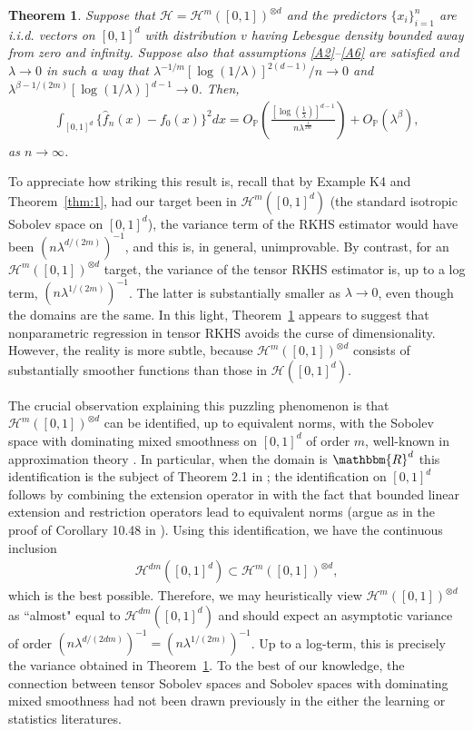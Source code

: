 \documentclass[11pt]{article}
\newtheorem{theorem}{Theorem}
\theoremstyle{definition}
\theoremstyle{remark}
\begin{document}
\begin{theorem}
\label{thm:2}
Suppose that $\mathcal{H} = \mathcal{H}^m([0,1])^{\otimes d}$ and the predictors $\{x_i\}_{i=1}^n$ are i.i.d. vectors on $[0,1]^d$ with distribution $v$ having Lebesgue density bounded away from zero and infinity. Suppose also that  assumptions \ref{A2}--\ref{A6} are satisfied and $\lambda \to 0$ in such a way that $\lambda^{-1/m} [\log(1/\lambda)]^{2(d-1)}/n \to 0$ and $\lambda^{\beta-1/(2m)} [\log(1/\lambda)]^{d-1} \to 0$. Then,
\begin{align*}
\int_{[0,1]^d} \{\widehat{f}_n(x) - f_0(x)\}^2 dx = O_{\mathbb{P}}\left( \frac{\left[\log\left(\frac{1}{\lambda} \right)\right]^{d-1} }{n \lambda^{\frac{1}{2m}}} \right) + O_{\mathbb{P}} ( \lambda^{\beta}),
\end{align*}
as $n \to \infty$.
\end{theorem}

To appreciate how striking this result is, recall that by Example K4 and Theorem~\ref{thm:1}, had our target been in $\mathcal{H}^m([0,1]^d)$ (the standard isotropic Sobolev space on $[0,1]^d$), the variance term of the RKHS estimator would have been $(n\lambda^{d/(2m)})^{-1}$, and this is, in general, unimprovable. By contrast, for an $\mathcal{H}^m([0,1])^{\otimes d}$ target, the variance of the tensor RKHS estimator is, up to a log term, $(n\lambda^{1/(2m)})^{-1}$. The latter is substantially smaller as $\lambda \to 0$, even though the domains are the same. In this light, Theorem~\ref{thm:2} appears to suggest that nonparametric regression in tensor RKHS avoids the curse of dimensionality. However, the reality is more subtle, because $\mathcal{H}^m([0,1])^{\otimes d}$ consists of substantially smoother functions than those in $\mathcal{H}([0,1]^d)$.

The crucial observation explaining this puzzling phenomenon is that $\mathcal{H}^m([0,1])^{\otimes d}$ can be identified, up to equivalent norms, with the Sobolev space with dominating mixed smoothness on $[0,1]^d$ of order $m$, well-known in approximation theory \citep{Triebel:2019}. In particular, when the domain is $\mathbbm{R}^d$ this identification is the subject of Theorem 2.1 in \citep{Sickel:2009}; the identification on $[0,1]^d$ follows by combining the extension operator in \citep[Proposition 1.25]{Triebel:2019} with the fact that bounded linear extension and restriction operators lead to equivalent norms (argue as in the proof of Corollary 10.48 in \citep{Wend:2005}). Using this identification, we have the continuous inclusion
\begin{align*}
\mathcal{H}^{dm}([0,1]^d) \subset \mathcal{H}^m([0,1])^{\otimes d},
\end{align*}
which is the best possible. Therefore, we may heuristically view $\mathcal{H}^m([0,1])^{\otimes d}$ as ``almost" equal to $\mathcal{H}^{dm}([0,1]^d)$ and should expect an asymptotic variance of order $(n \lambda^{d/(2dm)})^{-1} = (n \lambda^{1/(2m)})^{-1}$. Up to a log-term, this is precisely the variance obtained in Theorem~\ref{thm:2}.  To the best of our knowledge, the connection between tensor Sobolev spaces and Sobolev spaces with dominating mixed smoothness had not been drawn previously in the either the learning or statistics literatures. 
\end{document}
